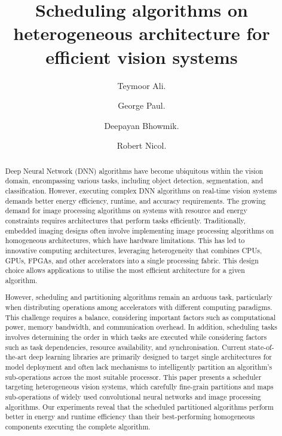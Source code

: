 \documentclass[]{spie}  %
\title{Scheduling algorithms on heterogeneous architecture for efficient vision systems }
\author[a]{Teymoor Ali. }
\author[a,b]{George Paul. }
\author[a]{Deepayan Bhowmik.}
\author[b]{Robert Nicol.}
\affil[a]{Newcastle University, 1 Science Square, Newcastle upon Tyne, U.K}
\affil[b]{STMicroelectronics, 1 Tanfield, Inverleith Row, Edinburgh, U.K}
\begin{document}
 
\maketitle

\begin{abstract}
Deep Neural Network (DNN) algorithms have become ubiquitous within the vision domain, encompassing various tasks, including object detection, segmentation, and classification. However, executing complex DNN algorithms on real-time vision systems demands better energy efficiency, runtime, and accuracy requirements. The growing demand for image processing algorithms on systems with resource and energy constraints requires architectures that perform tasks efficiently. Traditionally, embedded imaging designs often involve implementing image processing algorithms on homogeneous architectures, which have hardware limitations. This has led to innovative computing architectures, leveraging heterogeneity that combines CPUs, GPUs, FPGAs, and other accelerators into a single processing fabric. This design choice allows applications to utilise the most efficient architecture for a given algorithm.


However, scheduling and partitioning algorithms remain an arduous task, particularly when distributing operations among accelerators with different computing paradigms. This challenge requires a balance, considering important factors such as computational power, memory bandwidth, and communication overhead. In addition, scheduling tasks involves determining the order in which tasks are executed while considering factors such as task dependencies, resource availability, and synchronisation. Current state-of-the-art deep learning libraries are primarily designed to target single architectures for model deployment and often lack mechanisms to intelligently partition an algorithm's sub-operations across the most suitable processor. This paper presents a scheduler targeting heterogeneous vision systems, which carefully fine-grain partitions and maps sub-operations of widely used convolutional neural networks and image processing algorithms. Our experiments reveal that the scheduled partitioned algorithms perform better in energy and runtime efficiency than their best-performing homogeneous components executing the complete algorithm.
\end{abstract}
\end{document}
